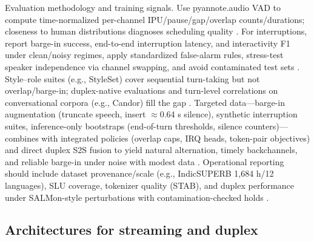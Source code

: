 \documentclass{article}
\begin{document}
Evaluation methodology and training signals. Use pyannote.audio VAD to compute time-normalized per-channel IPU/pause/gap/overlap counts/durations; closeness to human distributions diagnoses scheduling quality \cite{lu2025slideintegratingspeechlanguagemodelllmsp}. For interruptions, report barge-in success, end-to-end interruption latency, and interactivity F1 under clean/noisy regimes, apply standardized false-alarm rules, stress-test speaker independence via channel swapping, and avoid contaminated test sets \cite{maimon2025salmonsuiteacousticlanguagemodelevaluati,tseng2025evaluationllmsspeechisoftenflawedtestset,wang2025ntppgenerativespeechlanguagemodelingdual}. Style--role suites (e.g., StyleSet) cover sequential turn-taking but not overlap/barge-in; duplex-native evaluations and turn-level correlations on conversational corpora (e.g., Candor) fill the gap \cite{chiang2025audioawarelargelanguagemodelsasjudgesspe,cui2025thinkbeforeyoutalkenhancingmeaningfuldia}. Targeted data---barge-in augmentation (truncate speech, insert $\approx$0.64 s silence), synthetic interruption suites, inference-only bootstraps (end-of-turn thresholds, silence counters)---combines with integrated policies (overlap caps, IRQ heads, token-pair objectives) and direct duplex S2S fusion to yield natural alternation, timely backchannels, and reliable barge-in under noise with modest data \cite{hu2025salmduplexefficientdirectmodelingspeechl,wang2023slmbridgethingapbetweenspeechtextfoundat,wang2025dualspeechlmtowardsunifiedspeechundersta}. Operational reporting should include dataset provenance/scale (e.g., IndicSUPERB 1,684 h/12 languages), SLU coverage, tokenizer quality (STAB), and duplex performance under SALMon-style perturbations with contamination-checked holds \cite{entry2025indicsuperbspeechprocessinguniversalperf,vashishth2024stabspeechtokenizerassessmentbenchmark,maimon2025salmonsuiteacousticlanguagemodelevaluati,yang2024buildingtaiwanesemandarinspokenlanguagem}.



\subsection{Architectures for streaming and duplex} \label{subsec:architecturesforstreamingandduplex}
\end{document}
